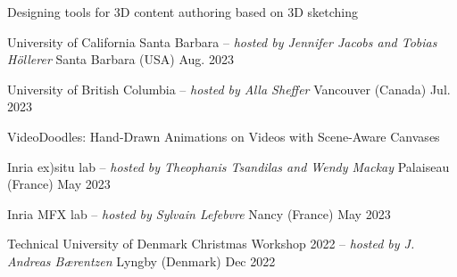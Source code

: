 

\begin{cventries}

\cvtalkseries
    {Designing tools for 3D content authoring based on 3D sketching}
    {\begin{cvtalks}
        \item {\cvtalk
            {University of California Santa Barbara -- \textit{hosted by Jennifer Jacobs and Tobias Höllerer}}
            {Santa Barbara (USA)} %
            {Aug. 2023} %
            }
        \item {\cvtalk
            {University of British Columbia -- \textit{hosted by Alla Sheffer}}
            {Vancouver (Canada)} %
            {Jul. 2023} %
            }
    \end{cvtalks}}


\cvtalkseries
    {VideoDoodles: Hand-Drawn Animations on Videos with Scene-Aware Canvases}
    {\begin{cvtalks}
        \item {\cvtalk
            {Inria ex)situ lab -- \textit{hosted by Theophanis Tsandilas and Wendy Mackay}}
            {Palaiseau (France)} %
            {May 2023} %
            }
        \item {\cvtalk
            {Inria MFX lab -- \textit{hosted by Sylvain Lefebvre}}
            {Nancy (France)} %
            {May 2023} %
            }
        \item {\cvtalk
            {Technical University of Denmark Christmas Workshop 2022  -- \textit{hosted by J. Andreas Bærentzen}}
            {Lyngby (Denmark)} %
            {Dec 2022} %
            }
    \end{cvtalks}}



\end{cventries}
